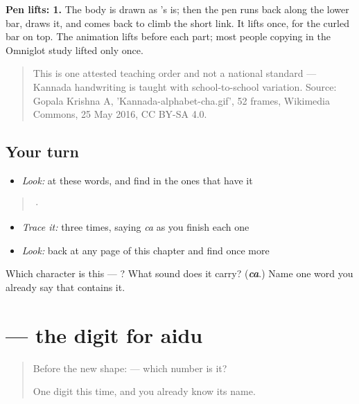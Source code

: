 \textbf{Pen lifts: 1.} The body is drawn as 's is; then the pen runs back along the lower bar, draws it, and comes back to climb the short link. It lifts once, for the curled bar on top. The animation lifts before each part; most people copying  in the Omniglot study lifted only once.

\begin{quote}
This is one attested teaching order and not a national standard — Kannada handwriting is taught with school-to-school variation. Source: Gopala Krishna A, 'Kannada-alphabet-cha.gif', 52 frames, Wikimedia Commons, 25 May 2016, CC BY-SA 4.0.
\end{quote}

\subsection*{Your turn}
\begin{itemize}
\raggedright
  \item \emph{Look:} at these words, and find  in the ones that have it
\end{itemize}

\begin{quote}
  ·  
\end{quote}

\begin{itemize}
\raggedright
  \item \emph{Trace it:}  three times, saying \emph{ca} as you finish each one
  \item \emph{Look:} back at any page of this chapter and find  once more
\end{itemize}

\begin{tcolorbox}[breakable,colback=teal!4,colframe=teal!35!black,title={Before you move on}]
Which character is this — ? What sound does it carry? (\emph{\textbf{ca}}.) Name one word you already say that contains it.
\end{tcolorbox}
\section[\texorpdfstring{\kn{೫} (5)}{೫ (5)}]{ — the digit for aidu}

\label{lesson:KA-S144-digit-five}



\begin{quote}
Before the new shape: \textbf{} — which number is it?

One digit this time, and you already know its name.
\end{quote}


